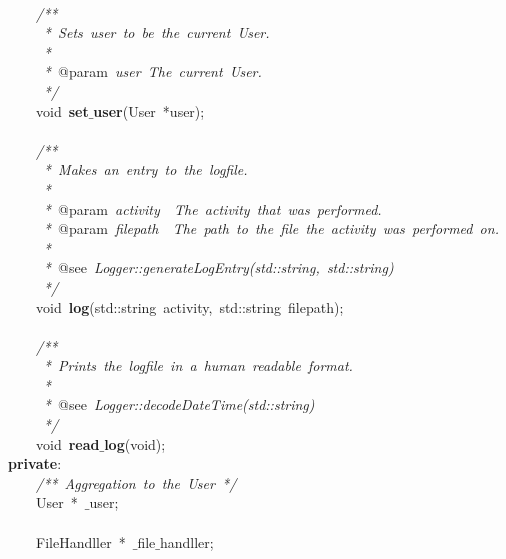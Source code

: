 \mbox{} \\
\mbox{}\ \ \ \ \textit{/**} \\
\mbox{}\textit{\ \ \ \ \ *\ Sets\ user\ to\ be\ the\ current\ User.} \\
\mbox{}\textit{\ \ \ \ \ *} \\
\mbox{}\textit{\ \ \ \ \ *\ }@param\textit{\ user\ The\ current\ User.} \\
\mbox{}\textit{\ \ \ \ \ */} \\
\mbox{}\ \ \ \ void\ \textbf{set$\_$user}(User\ *user); \\
\mbox{} \\
\mbox{}\ \ \ \ \textit{/**} \\
\mbox{}\textit{\ \ \ \ \ *\ Makes\ an\ entry\ to\ the\ logfile.} \\
\mbox{}\textit{\ \ \ \ \ *} \\
\mbox{}\textit{\ \ \ \ \ *\ }@param\textit{\ activity\ \ The\ activity\ that\ was\ performed.} \\
\mbox{}\textit{\ \ \ \ \ *\ }@param\textit{\ filepath\ \ The\ path\ to\ the\ file\ the\ activity\ was\ performed\ on.} \\
\mbox{}\textit{\ \ \ \ \ *} \\
\mbox{}\textit{\ \ \ \ \ *\ }@see\textit{\ Logger::generateLogEntry(std::string,\ std::string)} \\
\mbox{}\textit{\ \ \ \ \ */} \\
\mbox{}\ \ \ \ void\ \textbf{log}(std::string\ activity,\ std::string\ filepath); \\
\mbox{} \\
\mbox{}\ \ \ \ \textit{/**} \\
\mbox{}\textit{\ \ \ \ \ *\ Prints\ the\ logfile\ in\ a\ human\ readable\ format.} \\
\mbox{}\textit{\ \ \ \ \ *} \\
\mbox{}\textit{\ \ \ \ \ *\ }@see\textit{\ Logger::decodeDateTime(std::string)} \\
\mbox{}\textit{\ \ \ \ \ */} \\
\mbox{}\ \ \ \ void\ \textbf{read$\_$log}(void); \\
\mbox{}\textbf{private}: \\
\mbox{}\ \ \ \ \textit{/**\ Aggregation\ to\ the\ User\ */} \\
\mbox{}\ \ \ \ User\ *\ $\_$user; \\
\mbox{} \\
\mbox{}\ \ \ \ FileHandller\ *\ $\_$file$\_$handller; \\
